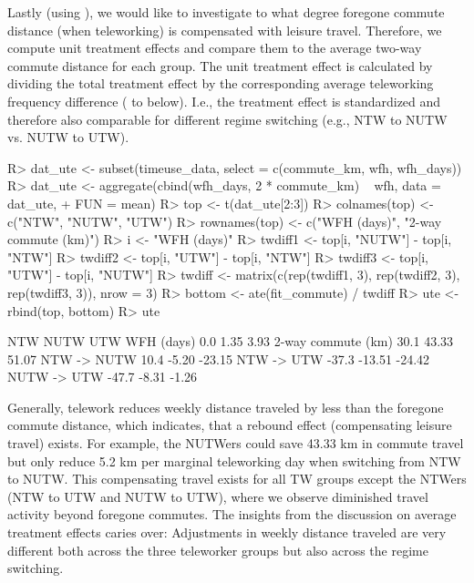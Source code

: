 \documentclass[%
    twoside, openright, titlepage, numbers=noenddot,%
    cleardoublepage=empty,%
    abstract=false,%
    BCOR=5.5mm, paper=a5, fontsize=10pt,%
]{scrreprt}
\begin{document}
Lastly (using ), we would like to investigate to what degree foregone commute distance (when teleworking) is compensated with leisure travel. Therefore, we compute unit treatment effects and compare them to the average two-way commute distance for each group. The unit treatment effect is calculated by dividing the total treatment effect by the corresponding average teleworking frequency difference ( to  below). I.e., the treatment effect is standardized and therefore also comparable for different regime switching (e.g., NTW to NUTW vs. NUTW to UTW).
%
\begin{Schunk}
\begin{Sinput}
R> dat_ute <- subset(timeuse_data, select = c(commute_km, wfh, wfh_days))
R> dat_ute <- aggregate(cbind(wfh_days, 2 * commute_km) ~ wfh, data = dat_ute,
+    FUN = mean)
R> top <- t(dat_ute[2:3])
R> colnames(top) <- c("NTW", "NUTW", "UTW")
R> rownames(top) <- c("WFH (days)", "2-way commute (km)")
R> i <- "WFH (days)"
R> twdiff1 <- top[i, "NUTW"] - top[i, "NTW"]
R> twdiff2 <- top[i, "UTW"] - top[i, "NTW"]
R> twdiff3 <- top[i, "UTW"] - top[i, "NUTW"]
R> twdiff <- matrix(c(rep(twdiff1, 3), rep(twdiff2, 3), rep(twdiff3, 3)), nrow = 3)
R> bottom <- ate(fit_commute) / twdiff
R> ute <- rbind(top, bottom)
R> ute
\end{Sinput}
\begin{Soutput}
                     NTW   NUTW    UTW
WFH (days)           0.0   1.35   3.93
2-way commute (km)  30.1  43.33  51.07
NTW -> NUTW         10.4  -5.20 -23.15
NTW -> UTW         -37.3 -13.51 -24.42
NUTW -> UTW        -47.7  -8.31  -1.26
\end{Soutput}
\end{Schunk}
%
Generally, telework reduces weekly distance traveled by less than the foregone commute distance, which indicates, that a rebound effect (compensating leisure travel) exists. For example, the NUTWers could save 43.33 km in commute travel but only reduce 5.2 km per marginal teleworking day when switching from NTW to NUTW. This compensating travel exists for all TW groups except the NTWers (NTW to UTW and NUTW to UTW), where we observe diminished travel activity beyond foregone commutes. The insights from the discussion on average treatment effects caries over: Adjustments in weekly distance traveled are very different both across the three teleworker groups but also across the regime switching.

\end{document}
